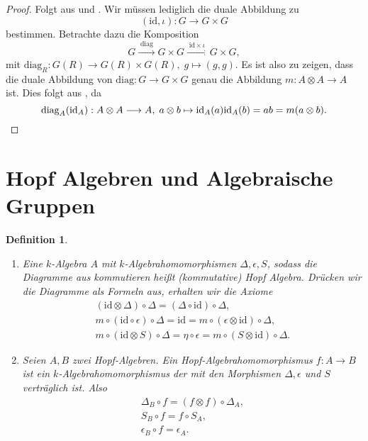 \documentclass[a4paper, 11pt]{scrartcl}
\newcommand{\id}{\text{id}}
\theoremstyle{basicstyle}
\newtheorem{definition}{Definition}[section]
\begin{document}
    \begin{proof}
        Folgt aus  und .
        Wir müssen lediglich die duale Abbildung zu \[(\id, \iota): G \to G \times G\] bestimmen.
        Betrachte dazu die Komposition
        \[G \xrightarrow{\;\text{diag}\;} G \times G \xrightarrow{\;\id \times \iota\;} G \times G,\]
        mit \(\text{diag}_R: G(R) \to G(R) \times G(R), \; g \mapsto (g, g)\).
        Es ist also zu zeigen, dass die duale Abbildung von \(\text{diag}: G \to G \times G\) genau die Abbildung \(m: A \otimes A \to A\) ist.
        Dies folgt aus , da 
        \[\text{diag}_A(\id_A): A \otimes A \longrightarrow A, \; a \otimes b \mapsto \id_A(a)\id_A(b) = ab = m(a \otimes b).\qedhere\]
    \end{proof}

    
    \section{Hopf Algebren und Algebraische Gruppen}

    \begin{definition}\label{def:1}
        \begin{enumerate}
            \item Eine \(k\)-Algebra \(A\) mit \(k\)-Algebrahomomorphismen \(\Delta, \epsilon, S\), sodass die Diagramme aus  kommutieren heißt \emph{(kommutative) Hopf Algebra}.
                Drücken wir die Diagramme als Formeln aus, erhalten wir die Axiome
                \begin{gather*}
                    (\id \otimes \Delta) \circ \Delta = (\Delta \circ \id) \circ \Delta, \\
                    m \circ (\id \circ \epsilon) \circ \Delta = \id = m \circ (\epsilon \otimes \id) \circ \Delta, \\
                    m \circ (\id \otimes S) \circ \Delta = \eta \circ \epsilon = m \circ (S \otimes \id) \circ \Delta.
                \end{gather*}

            \item Seien \(A, B\) zwei Hopf-Algebren.
                Ein Hopf-Algebrahomomorphismus \(f: A \to B\) ist ein \(k\)-Algebrahomomorphismus der mit den Morphismen \(\Delta, \epsilon\) und \(S\) verträglich ist.
                Also
                \begin{gather*}
                    \Delta_B \circ f = (f \otimes f) \circ \Delta_A, \\
                    S_B \circ f = f \circ S_A, \\
                    \epsilon_B \circ f = \epsilon_A.
                \end{gather*}
        \end{enumerate}
    \end{definition}
\end{document}
